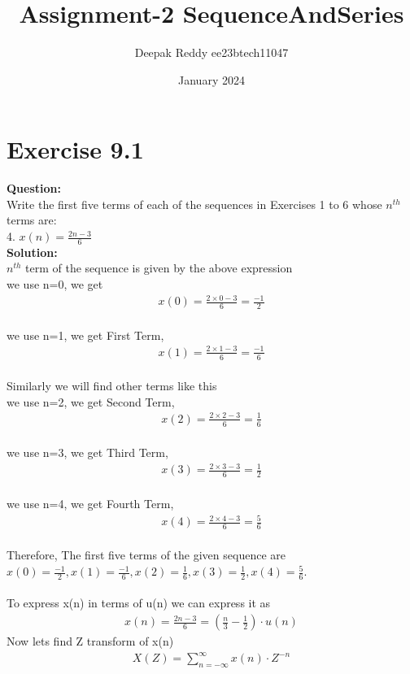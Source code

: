 \documentclass[journal,12pt,twocolumn]{IEEEtran}
\title{Assignment-2 SequenceAndSeries}
\author{Deepak Reddy ee23btech11047}
\date{January 2024}
\theoremstyle{remark}
\begin{document}
\maketitle
\section*{Exercise 9.1}
\textbf{Question:}\\
Write the first five terms of each of the sequences in Exercises 1 to 6 whose $n^{th}$
terms are:\\
4. $x(n) = \frac{2n-3}{6}$\\
\textbf{Solution:}\\
$n^{th}$ term of the sequence is given by the above expression\\
we use n=0, we get
\begin{align} x(0) = \frac{2 \times 0 - 3}{6} = \frac{-1}{2} \end{align}\\
we use n=1, we get First Term,
\begin{align} x(1) = \frac{2 \times 1 - 3}{6} = \frac{-1}{6} \end{align}\\
Similarly we will find other terms like this\\
we use n=2, we get Second Term,
\begin{align} x(2) = \frac{2 \times 2 - 3}{6} = \frac{1}{6}  \end{align}\\
we use n=3, we get Third Term,
\begin{align} x(3) = \frac{2 \times 3 - 3}{6} = \frac{1}{2} \end{align}\\
we use n=4, we get Fourth Term,
\begin{align} x(4) = \frac{2 \times 4 - 3}{6} = \frac{5}{6} \end{align}\\
Therefore, The first five terms of the given sequence are
$x(0) = \frac{-1}{2}, x(1) = \frac{-1}{6},x(2) = \frac{1}{6}, x(3) = \frac{1}{2} , x(4) = \frac{5}{6}.$\\
\\
To express x(n) in terms of u(n) we can express it as 
\begin{align} x(n) = \frac{2n-3}{6} = \left(\frac{n}{3} - \frac{1}{2} \right)\cdot u(n) \end{align}
\bigskip
Now lets find Z transform of x(n)
\begin{align} X(Z) = \sum_{n = -\infty}^{\infty} x(n) \cdot Z^{-n} \end{align}
\end{document}
